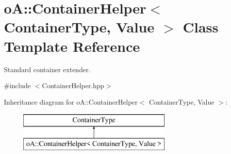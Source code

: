 \hypertarget{classo_a_1_1_container_helper}{}\section{oA\+:\+:Container\+Helper$<$ Container\+Type, Value $>$ Class Template Reference}
\label{classo_a_1_1_container_helper}


Standard container extender.  




{\ttfamily \#include $<$Container\+Helper.\+hpp$>$}

Inheritance diagram for oA\+:\+:Container\+Helper$<$ Container\+Type, Value $>$\+:\begin{figure}[H]
\begin{center}
\leavevmode
\includegraphics[height=2.000000cm]{classo_a_1_1_container_helper}
\end{center}
\end{figure}
